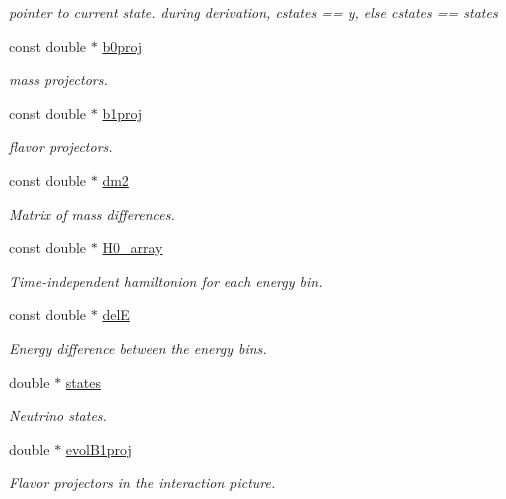 \begin{DoxyCompactItemize}
\begin{DoxyCompactList}\small\item\em pointer to current state. during derivation, cstates == y, else cstates == states \end{DoxyCompactList}\item 
const double $\ast$ \hyperlink{structcudanusquids_1_1Physics_ac18048b4896ce37db168be19538fbfde}{b0proj}
\begin{DoxyCompactList}\small\item\em mass projectors. \end{DoxyCompactList}\item 
const double $\ast$ \hyperlink{structcudanusquids_1_1Physics_a31d89b9634cc518ba1106717dd76de15}{b1proj}
\begin{DoxyCompactList}\small\item\em flavor projectors. \end{DoxyCompactList}\item 
const double $\ast$ \hyperlink{structcudanusquids_1_1Physics_a1a7778a672f21550ef4786acc2c01aab}{dm2}
\begin{DoxyCompactList}\small\item\em Matrix of mass differences. \end{DoxyCompactList}\item 
const double $\ast$ \hyperlink{structcudanusquids_1_1Physics_a8214408e1b93e64ccd5e0ccad05627bf}{H0\+\_\+array}
\begin{DoxyCompactList}\small\item\em Time-\/independent hamiltonion for each energy bin. \end{DoxyCompactList}\item 
const double $\ast$ \hyperlink{structcudanusquids_1_1Physics_af81e038971a9c70768911241647b73f5}{delE}
\begin{DoxyCompactList}\small\item\em Energy difference between the energy bins. \end{DoxyCompactList}\item 
double $\ast$ \hyperlink{structcudanusquids_1_1Physics_ae9ef595d9cbb5003a19c3c6afce673f8}{states}
\begin{DoxyCompactList}\small\item\em Neutrino states. \end{DoxyCompactList}\item 
double $\ast$ \hyperlink{structcudanusquids_1_1Physics_a1e8bf327f8744c94ed63272041b41d34}{evol\+B1proj}
\begin{DoxyCompactList}\small\item\em Flavor projectors in the interaction picture. \end{DoxyCompactList}\item 

\end{DoxyCompactItemize}
